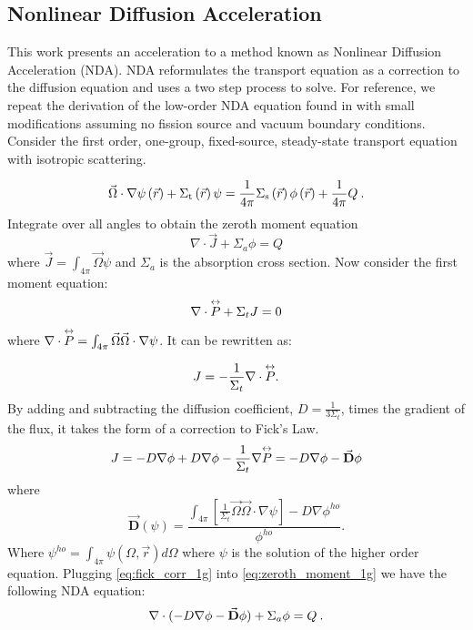 \subsection{Nonlinear Diffusion Acceleration}
This work presents an acceleration to a method known as Nonlinear Diffusion Acceleration (NDA). NDA reformulates the transport equation as a correction to the diffusion equation and uses a two step process to solve. For reference, we repeat the derivation of the low-order NDA equation found in \cite{morel-holo} with small modifications assuming no fission source and vacuum boundary conditions. Consider the first order, one-group, fixed-source, steady-state \sn transport equation with isotropic scattering. 

  \begin{equation}
  \vec{\Omega}\cdot \nabla \psi \left(\vec{r}\right)+ \Sigma_{\mathrm{t}}\left(\vec{r}\right)\psi = \frac{1}{4 \pi} \Sigma_{\mathrm{s}}\left(\vec{r}\right) \phi\left(\vec{r}\right) + \frac{1}{4 \pi} Q\:.
  \end{equation}
Integrate over all angles to obtain the zeroth moment equation
\begin{equation}
  \nabla \cdot \vec{J} + \Sigma_a\phi  =  Q
  \label{eq:zeroth_moment_1g}
  \end{equation}
where $\vec{J} = \int_{4\pi} \vec{\Omega}\psi$ and $\Sigma_a$ is the absorption cross section.   Now consider the first moment equation:
  \begin{equation}
  \nabla \cdot \overset{\text{\scriptsize$\leftrightarrow$}}{P} + \Sigma_t J = 0
  \end{equation}
where $\nabla \cdot \overset{\text{\scriptsize$\leftrightarrow$}}{P} =  \int_{4\pi} \vec{\Omega} \vec{\Omega} \cdot \nabla \psi$. It can be rewritten as: 

  \begin{equation}
  J= -\frac{1}{\Sigma_t} \nabla \cdot \overset{\text{\scriptsize$\leftrightarrow$}}{P}. 
  \end{equation}
  By adding and subtracting the diffusion coefficient, $D = \frac{1}{3\Sigma_t}$, times the gradient of the flux, it takes the form of a correction to Fick's Law. 
  \begin{equation}
  J = -D \nabla \phi + D \nabla \phi - \frac{1}{\Sigma_t} \nabla \overset{\text{\scriptsize$\leftrightarrow$}}{P} \\
  = -D \nabla \phi - \vec{\textbf{D}} \phi
  \label{eq:fick_corr_1g}
  \end{equation}
  where 
 \begin{equation}
  \vec{\textbf{D}} (\psi) = \frac{\int_{4\pi} [\frac{1}{\Sigma_t} \vec{\Omega} \vec{\Omega}\cdot \nabla \psi] - D \nabla \phi^{ho}}{\phi^{ho}}.
  \label{eq:drift_vector}
  \end{equation} 
Where $\psi^{ho} = \int_{4\pi} \psi(\Omega, \vec{r}) d\Omega$ where $\psi$ is the solution of the higher order equation. Plugging \eqref{eq:fick_corr_1g} into \eqref{eq:zeroth_moment_1g} we have the following NDA equation:
  \begin{equation}
  \nabla\cdot(-D \nabla \phi - \vec{\bf D} \phi) + \Sigma_a \phi = Q \:. \label{eq:NDA_1g}
  \end{equation}
  
